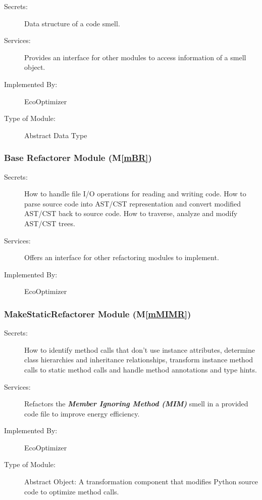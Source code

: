 \documentclass[12pt, titlepage]{article}
\newcommand{\mref}[1]{M\ref{#1}}
\begin{document}
\begin{description}
\item[Secrets:] Data structure of a code smell.
\item[Services:] Provides an interface for other modules to access information of a smell object.
\item[Implemented By:] EcoOptimizer
\item[Type of Module:] Abstract Data Type
\end{description}

\subsubsection{Base Refactorer Module (\mref{mBR})}


\begin{description}
    \item[Secrets:] How to handle file I/O operations for reading and writing code. How to parse source code into AST/CST representation and convert modified AST/CST back to source code. How to traverse, analyze and modify AST/CST trees.
    \item[Services:] Offers an interface for other refactoring modules to implement.
    \item[Implemented By:] EcoOptimizer
\end{description}

\subsubsection{MakeStaticRefactorer Module (\mref{mMIMR})}

\begin{description}
\item[Secrets:] How to identify method calls that don't use instance attributes, determine class hierarchies and inheritance relationships, transform instance method calls to static method calls and handle method annotations and type hints.
\item[Services:] Refactors the \textit{\textbf{Member Ignoring Method (MIM)}} smell in a provided code file to improve energy efficiency.
\item[Implemented By:] EcoOptimizer
\item[Type of Module:] Abstract Object: A transformation component that modifies Python source code to optimize method calls.
\end{description}
\end{document}
